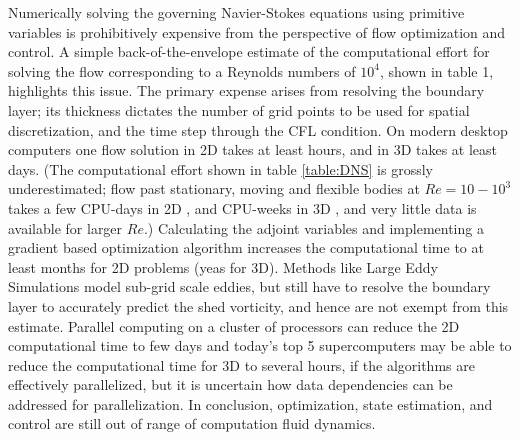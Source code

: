 Numerically solving the governing Navier-Stokes equations using primitive variables is prohibitively expensive from the perspective of flow optimization and control.
A simple back-of-the-envelope estimate of the computational effort for solving the flow corresponding to a Reynolds numbers of $10^4$, shown in table 1, highlights this issue.
The primary expense arises from resolving the boundary layer; its thickness dictates the number of grid points to be used for spatial discretization, and the time step through the CFL condition.
On modern desktop computers one flow solution in 2D takes at least hours, and in 3D takes at least days. (The computational effort shown in table \ref{table:DNS} is grossly underestimated; flow past stationary, moving and flexible bodies at $Re = 10 - 10^3$ takes a few CPU-days in 2D \cite{mittal2005immersed}, and CPU-weeks in 3D \cite{pesavento2009flapping,mittal2005immersed}, and very little data is available for larger $Re$.)
Calculating the adjoint variables and implementing a gradient based optimization algorithm \cite{wang2009minimal} increases the computational time to at least months for 2D problems (yeas for 3D).
Methods like Large Eddy Simulations model sub-grid scale eddies, but still have to resolve the boundary layer to accurately predict the shed vorticity, and hence are not exempt from this estimate.
Parallel computing on a cluster of processors can reduce the 2D computational time to few days and today's top 5 supercomputers may be able to reduce the computational time for 3D to several hours, if the algorithms are effectively parallelized, but it is uncertain how data dependencies can be addressed for parallelization.
In conclusion, optimization, state estimation, and control are still out of range of computation fluid dynamics.


